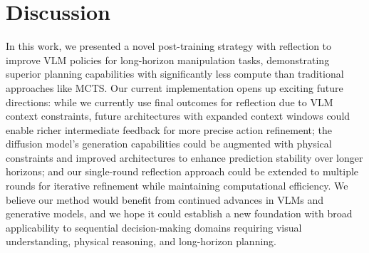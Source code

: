 \section{Discussion}\label{sec:discussion}
In this work, we presented a novel post-training strategy with reflection to improve VLM policies for long-horizon manipulation tasks, demonstrating superior planning capabilities with significantly less compute than traditional approaches like MCTS. Our current implementation opens up exciting future directions: while we currently use final outcomes for reflection due to VLM context constraints, future architectures with expanded context windows could enable richer intermediate feedback for more precise action refinement; the diffusion model's generation capabilities could be augmented with physical constraints and improved architectures to enhance prediction stability over longer horizons; and our single-round reflection approach could be extended to multiple rounds for iterative refinement while maintaining computational efficiency. 
We believe our method would benefit from continued advances in VLMs and generative models, and we hope it could establish a new foundation with broad applicability to sequential decision-making domains requiring visual understanding, physical reasoning, and long-horizon planning.
